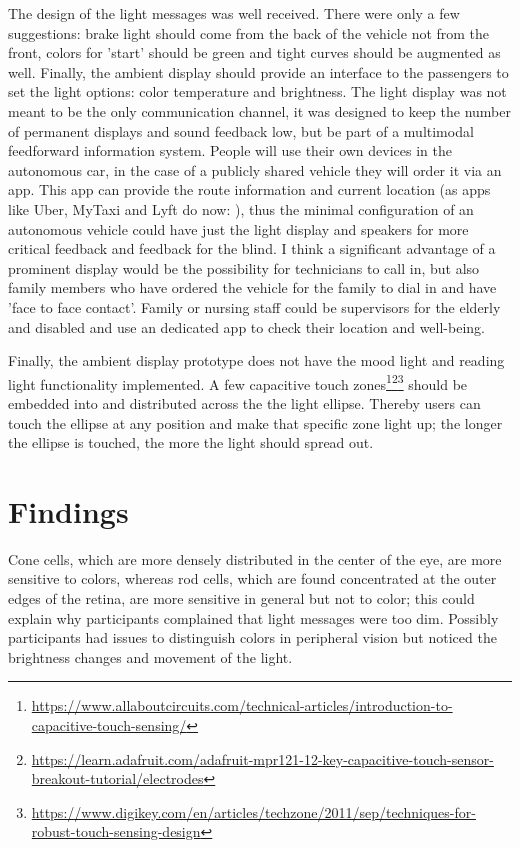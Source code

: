 The design of the light messages was well received. There were only a few suggestions: brake light should come from the back of the vehicle not from the front, colors for 'start' should be green and tight curves should be augmented as well. Finally, the ambient display should provide an interface to the passengers to set the light options: color temperature and brightness. 
The light display was not meant to be the only communication channel, it was designed to keep the number of permanent displays and sound feedback low, but be part of a multimodal feedforward information system. People will use their own devices in the autonomous car, in the case of a publicly shared vehicle they will order it via an app. This app can provide the route information and current location (as apps like Uber, MyTaxi and Lyft do now: \emph{}), thus the minimal configuration of an autonomous vehicle could have just the light display and speakers for more critical feedback and feedback for the blind. I think a significant advantage of a prominent display would be the possibility for technicians to call in, but also family members who have ordered the vehicle for the family to dial in and have 'face to face contact'. Family or nursing staff could be supervisors for the elderly and disabled and use an dedicated app to check their location and well-being.

Finally, the ambient display prototype does not have the mood light and reading light functionality implemented.  A few capacitive touch zones\footnote{\url{https://www.allaboutcircuits.com/technical-articles/introduction-to-capacitive-touch-sensing/}}\fnsep\footnote{\url{https://learn.adafruit.com/adafruit-mpr121-12-key-capacitive-touch-sensor-breakout-tutorial/electrodes}}\fnsep\footnote{\url{https://www.digikey.com/en/articles/techzone/2011/sep/techniques-for-robust-touch-sensing-design}} should be embedded into and distributed across the the light ellipse. Thereby users can touch the ellipse at any position and make that specific zone light up; the longer the ellipse is touched, the more the light should spread out. 

\section{Findings}
\label{sec:findings}
Cone cells, which are more densely distributed in the center of the eye, are more sensitive to colors, whereas rod cells, which are found concentrated at the outer edges of the retina, are more sensitive in general but not to color; this could explain why participants complained that light messages were too dim. Possibly participants had issues to distinguish colors in peripheral vision but noticed the brightness changes and movement of the light.  %